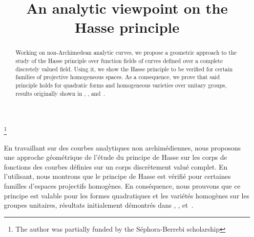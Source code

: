 \documentclass[JEP,XML,SOM,Unicode,NoFloatCountersInSection,published]{cedram}
\theoremstyle{definition}
\begin{document}
\frontmatter

\title{An analytic viewpoint on the Hasse principle}

\author[\initial{V.} \lastname{Mehmeti}]{ }
\address{Sorbonne Université and Paris Cité, CNRS, IMJ-PRG,\\
F-75005 Paris, France}

\thanks{The author was partially funded by the Séphora-Berrebi scholarship}

\begin{abstract}
Working on non-Archimedean analytic curves, we propose a geometric approach to the study of the Hasse principle over function fields of curves defined over a complete discretely valued field. Using it, we show the Hasse principle to be verified for certain families of projective homogeneous spaces. As a consequence, we prove that said principle holds for quadratic forms and homogeneous varieties over unitary groups, results originally shown in \cite{ctps}, \cite{wu}, and~\cite{parsur}.
\end{abstract}





\begin{altabstract}
En travaillant sur des courbes analytiques non archimédiennes, nous proposons une approche géométrique de l'étude du principe de Hasse sur les corps de fonctions des courbes définies sur un corps discrètement valué complet. En l'utilisant, nous montrons que le principe de Hasse est vérifié pour certaines familles d'espaces projectifs homogènes. En conséquence, nous prouvons que ce principe est valable pour les formes quadratiques et les variétés homogènes sur les groupes unitaires, résultats initialement démontrés dans \cite{ctps}, \cite{wu}, et~\cite{parsur}.
\end{altabstract}

\maketitle
\vspace*{-\baselineskip}
\tableofcontents
\mainmatter
\end{document}
